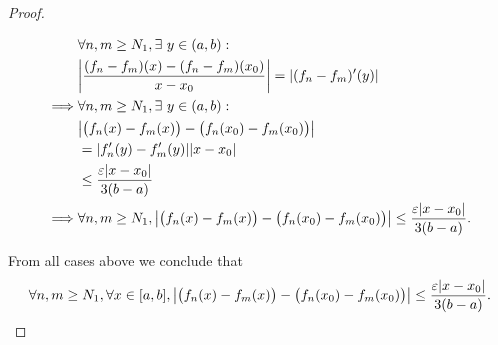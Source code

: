 \begin{proof}
\begin{itemize}
\begin{align*}
                     & \forall n, m \geq N_1, \exists\ y \in (a, b) :                                                                                          \\
                     & \abs{\frac{(f_n - f_m)(x) - (f_n - f_m)(x_0)}{x - x_0}} = \abs{(f_n - f_m)'(y)}                                                         \\
            \implies & \forall n, m \geq N_1, \exists\ y \in (a, b) :                                                                                          \\
                     & \abs{\big(f_n(x) - f_m(x)\big) - \big(f_n(x_0) - f_m(x_0)\big)}                                                                         \\
                     & = \abs{f_n'(y) - f_m'(y)} \abs{x - x_0}                                                                                                 \\
                     & \leq \frac{\varepsilon \abs{x - x_0}}{3(b - a)}                                                                                         \\
            \implies & \forall n, m \geq N_1, \abs{\big(f_n(x) - f_m(x)\big) - \big(f_n(x_0) - f_m(x_0)\big)} \leq \frac{\varepsilon \abs{x - x_0}}{3(b - a)}.
          \end{align*}
  \end{itemize}
  From all cases above we conclude that
  \[
    \forall n, m \geq N_1, \forall x \in [a, b], \abs{\big(f_n(x) - f_m(x)\big) - \big(f_n(x_0) - f_m(x_0)\big)} \leq \frac{\varepsilon \abs{x - x_0}}{3(b - a)}.
  \]


\end{proof}
